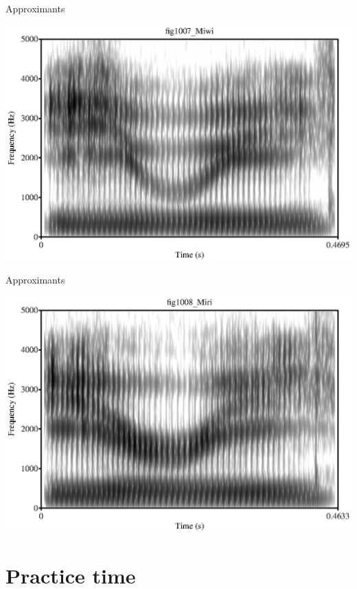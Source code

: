 \documentclass[professionalfonts]{beamer}
\begin{document}
\begin{frame}{Approximants}
    \begin{center}
        \includegraphics[width = \textwidth]{figs/iwi.eps}
    \end{center}
\end{frame}

\begin{frame}{Approximants}
    \begin{center}
        \includegraphics[width = \textwidth]{figs/iri.eps}
    \end{center}
\end{frame}

\section*{Practice time}
\end{document}
